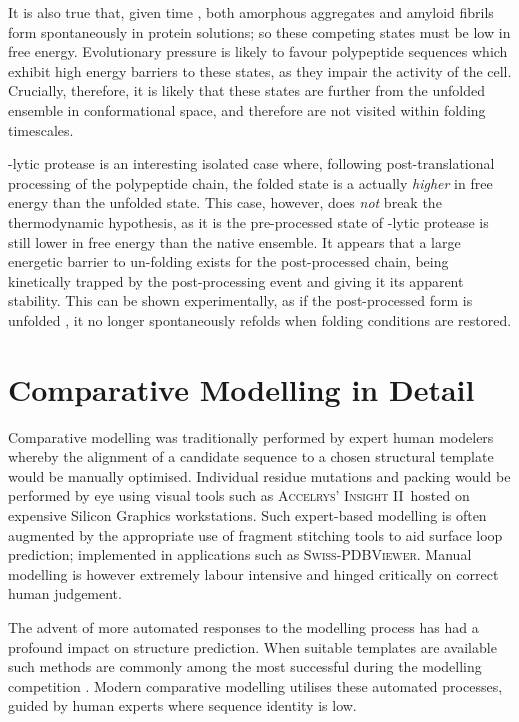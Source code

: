 It is also true that, given time \invitro, both amorphous aggregates and amyloid fibrils form spontaneously in protein solutions; so these competing
states must be low in free energy. Evolutionary pressure
is likely to favour polypeptide sequences which exhibit high energy
barriers to these    
 states, as they impair the activity of the cell.  Crucially, therefore, it
is likely that these states are further from the unfolded ensemble
 in conformational space, and therefore are not visited within folding timescales. 

\al-lytic protease is an interesting isolated case where, following post-translational
processing
of the polypeptide chain,  the folded state is a actually \emph{higher} in free energy than the unfolded state\cite{NATIVE:unfolded:lowerenergy}. This
case, however, does \emph{not}  break the thermodynamic hypothesis, as it is the pre-processed
state
of \al-lytic protease
is still lower in free energy than the native ensemble.
It appears that a large energetic barrier to un-folding exists for the post-processed chain, being kinetically trapped by the post-processing event and giving it  its apparent stability. This can be shown experimentally,
as
if the post-processed form is unfolded \invitro, it no longer spontaneously
refolds when folding conditions are restored.






 



\section{Comparative Modelling in Detail}
\label{section:comparative_modelling}


Comparative modelling was traditionally performed by expert human modelers whereby
the  alignment of a candidate sequence to a chosen structural template  would be manually optimised. Individual residue
mutations and packing would be performed by eye using visual tools such as
\textsc{Accelrys' Insight II}~hosted on expensive Silicon
Graphics workstations. Such expert-based modelling is often augmented by
 the appropriate use of fragment stitching tools to aid surface loop prediction; implemented in applications such as \textsc{Swiss-PDBViewer}\cite{METHOD:SWISSPDB:A,METHOD:SWISSPDB:B}. Manual modelling is
however extremely labour intensive and hinged critically on correct human judgement.

The advent of more automated responses to the modelling process  has had
a profound impact on structure prediction. When suitable templates
are available such methods are commonly
among the most successful during the modelling competition \casp\cite{METHOD:CASP6:CM}. Modern
comparative modelling utilises these automated processes, guided by human
experts where sequence identity is low. 


